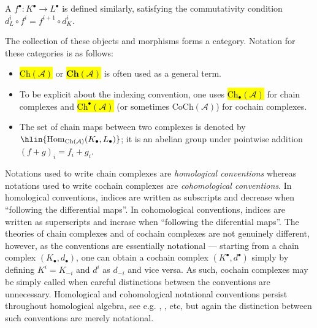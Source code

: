 \begin{definition}
\begin{enumerate}
    A  $f^\bullet: K^\bullet \to L^\bullet$ is defined similarly, satisfying the commutativity condition $d_L^i \circ f^i = f^{i+1} \circ d_K^i$.
\end{enumerate}

The collection of these objects and morphisms forms a category. Notation for these categories is as follows:
\begin{itemize}
    \item \hl{$\mathrm{Ch}(\mathcal{A})$} or \hl{$\mathbf{Ch}(\mathcal{A})$} is often used as a general term.
    \item To be explicit about the indexing convention, one uses \hl{$\mathrm{Ch}_\bullet(\mathcal{A})$} for chain complexes and \hl{$\mathrm{Ch}^\bullet(\mathcal{A})$} (or sometimes $\mathrm{CoCh}(\mathcal{A})$) for cochain complexes.
    \item The set of chain maps between two complexes is denoted by $\hlin{\operatorname{Hom}_{\mathrm{Ch}(\mathcal{A})}(K_\bullet, L_\bullet)}$; it is an abelian group under pointwise addition $(f+g)_i = f_i + g_i$.
\end{itemize}

Notations used to write chain complexes are \emph{homological conventions} whereas notations used to write cochain complexes are \emph{cohomological conventions}. In homological conventions, indices are written as subscripts and decrease when ``following the differential maps''. In cohomological conventions, indices are written as superscripts and incrase when ``following the diferential maps''. The theories of chain complexes and of cochain complexes are not genuinely different, however, as the conventions are essentially notational --- starting from a chain complex $(K_\bullet, d_\bullet)$, one can obtain a cochain complex $(K^\bullet, d^\bullet)$ simply by defining $K^i = K_{-i}$ and $d^i$ as $d_{-i}$ and vice versa. As such, cochain complexes may be simply called  when careful distinctions between the conventions are unnecessary. Homological and cohomological notational conventions persist throughout homological algebra, see e.g. , , etc, but again the distinction between such conventions are merely notational.


\end{definition}

